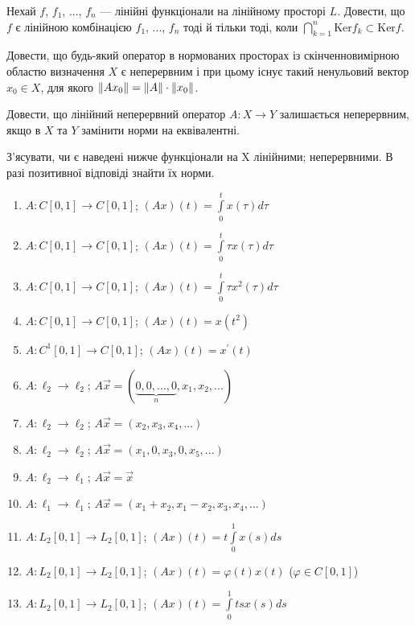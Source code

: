 \begin{exercise}
    Нехай $f$, $f_1$, ..., $f_n$ --- лінійні функціонали на лінійному просторі $L$. 
    Довести, що $f$ є лінійною комбінацією $f_1$, ..., $f_n$ тоді й тільки тоді, 
    коли $\bigcap\limits_{k=1}^n \mathrm{Ker} f_k \subset \mathrm{Ker} f$.
\end{exercise}

\begin{exercise}
    Довести, що будь-який оператор в нормованих просторах із скінченновимірною областю 
    визначення $X$ є неперервним і при цьому існує такий ненульовий вектор $x_0 \in X$, 
    для якого $\left\lVert Ax_0\right\rVert = \left\lVert A\right\rVert\cdot\left\lVert x_0\right\rVert$.
\end{exercise}

\begin{exercise}
    Довести, що лінійний неперервний оператор $A: X \rightarrow Y$ залишається неперервним, 
    якщо в $X$ та $Y$ замінити норми на еквівалентні.
\end{exercise}

\begin{exercise}
    З'ясувати, чи є наведені нижче функціонали на X лінійними; 
    неперервними. В разі позитивної відповіді знайти їх норми.
    \begin{enumerate}[label=\ukr*)]
        \item $A: C[0, 1] \rightarrow C[0, 1]$; $(Ax)(t) = \int\limits_0^t x(\tau) d\tau$
        \item $A: C[0, 1] \rightarrow C[0, 1]$; $(Ax)(t) = \int\limits_0^t \tau x(\tau) d\tau$
        \item $A: C[0, 1] \rightarrow C[0, 1]$; $(Ax)(t) = \int\limits_0^t \tau x^2(\tau) d\tau$
        \item $A: C[0, 1] \rightarrow C[0, 1]$; $(Ax)(t) = x(t^2)$
        \item $A: C^1[0, 1] \rightarrow C[0, 1]$; $(Ax)(t) = x^\prime (t)$ 
        \item $A: \ell_2 \rightarrow \ell_2$; $A\vec{x} = (\underbrace{0,0,...,0}_n,
        x_1,x_2,...)$
        \item $A: \ell_2 \rightarrow \ell_2$; $A\vec{x} = (x_2,x_3,x_4,...)$
        \item $A: \ell_2 \rightarrow \ell_2$; $A\vec{x} = (x_1,0,x_3,0,x_5,...)$
        \item $A: \ell_2 \rightarrow \ell_1$; $A\vec{x} = \vec{x}$
        \item $A: \ell_1 \rightarrow \ell_1$; $A\vec{x} = (x_1+x_2, x_1-x_2, x_3, x_4, ...)$
        \item $A: L_2[0, 1] \rightarrow L_2[0, 1]$; $(Ax)(t) = t \int\limits_0^1 x(s)ds$
        \item $A: L_2[0, 1] \rightarrow L_2[0, 1]$; $(Ax)(t) = \varphi(t)x(t)$ 
        ($\varphi \in C[0,1]$)
        \item $A: L_2[0, 1] \rightarrow L_2[0, 1]$; $(Ax)(t) = \int\limits_0^1 tsx(s)ds$
    \end{enumerate}
\end{exercise}